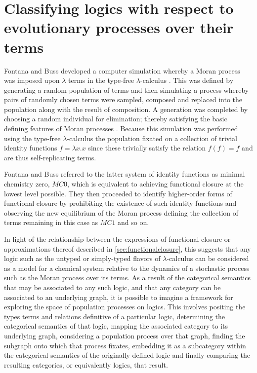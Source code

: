 \documentclass[10pt]{article}
\theoremstyle{plain}
\theoremstyle{definition}
\theoremstyle{remark}
\begin{document}
\section{Classifying logics with respect to evolutionary processes over their terms}

Fontana and Buss developed a computer simulation whereby a Moran process was imposed upon $\lambda$ terms in the type-free $\lambda$-calculus \cite{Fontana1994,Fontana1996}. This was defined by generating a random population of terms and then simulating a process whereby pairs of randomly chosen terms were sampled, composed and replaced into the population along with the result of composition. A generation was completed by choosing a random individual for elimination; thereby satisfying the basic defining features of Moran processes \cite{Moran1958}. Because this simulation was performed using the type-free $\lambda$-calculus the population fixated on a collection of trivial identity functions $f = \lambda x. x$ since these trivially satisfy the relation $f(f) = f$ and are thus self-replicating terms.

Fontana and Buss referred to the latter system of identity functions as minimal chemistry zero, $MC0$, which is equivalent to achieving functional closure at the lowest level possible. They then proceeded to identify higher-order forms of functional closure by prohibiting the existence of such identity functions and observing the new equilibrium of the Moran process defining the collection of terms remaining in this case as $MC1$ and so on.

In light of the relationship between the expressions of functional closure or approximations thereof described in \ref{sec:functionalclosure}, this suggests that any logic such as the untyped or simply-typed flavors of $\lambda$-calculus can be considered as a model for a chemical system relative to the dynamics of a stochastic process such as the Moran process over its terms. As a result of the categorical semantics that may be associated to any such logic, and that any category can be associated to an underlying graph, it is possible to imagine a framework for exploring the space of population processes on logics. This involves positing the types terms and relations definitive of a particular logic, determining the categorical semantics of that logic, mapping the associated category to its underlying graph, considering a population process over that graph, finding the subgraph onto which that process fixates, embedding it as a subcategory within the categorical semantics of the originally defined logic and finally comparing the resulting categories, or equivalently logics, that result.
\end{document}
